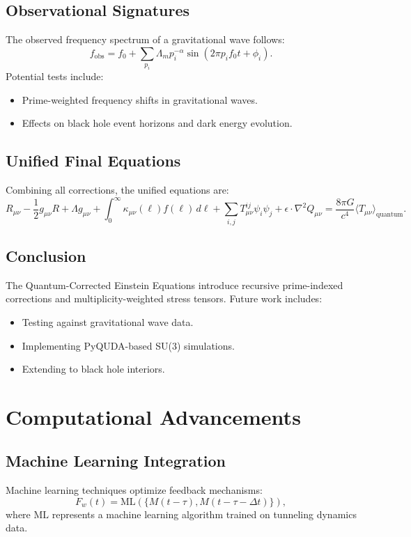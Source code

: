 \documentclass[12]{amsart}
\theoremstyle{plain}
\begin{document}
\subsection{Observational Signatures}
The observed frequency spectrum of a gravitational wave follows:
\begin{equation}
    f_{\text{obs}} = f_0 + \sum_{p_i} \Lambda_m p_i^{-\alpha} \sin(2\pi p_i f_0 t + \phi_i).
\end{equation}
Potential tests include:
\begin{itemize}
    \item Prime-weighted frequency shifts in gravitational waves.
    \item Effects on black hole event horizons and dark energy evolution.
\end{itemize}

\subsection{Unified Final Equations}
Combining all corrections, the unified equations are:
\begin{equation}
    R_{\mu\nu} - \frac{1}{2} g_{\mu\nu} R + \Lambda g_{\mu\nu} + \int_{0}^{\infty} \kappa_{\mu\nu}(\ell) f(\ell) \, d\ell + \sum_{i,j} T_{\mu\nu}^{ij} \psi_i \psi_j + \epsilon \cdot \nabla^2 Q_{\mu\nu} = \frac{8 \pi G}{c^4} \langle T_{\mu\nu} \rangle_{\text{quantum}}.
\end{equation}

\subsection{Conclusion}
The Quantum-Corrected Einstein Equations introduce recursive prime-indexed corrections and multiplicity-weighted stress tensors. Future work includes:
\begin{itemize}
    \item Testing against gravitational wave data.
    \item Implementing PyQUDA-based SU(3) simulations.
    \item Extending to black hole interiors.
\end{itemize}


\section{Computational Advancements}

\subsection{Machine Learning Integration}
Machine learning techniques optimize feedback mechanisms:
\begin{equation}
F_w(t) = \text{ML}(\{M(t - \tau), M(t - \tau - \Delta t)\}),
\end{equation}
where $\text{ML}$ represents a machine learning algorithm trained on tunneling dynamics data.
\end{document}
